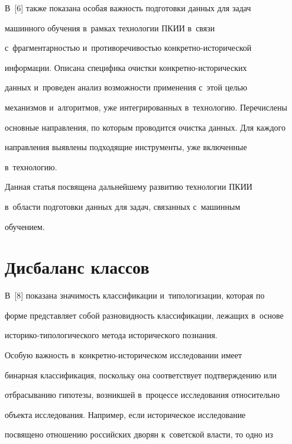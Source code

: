   


В~[6] также показана особая важность подготовки данных для задач 


машинного обучения в~рамках технологии ПКИИ в~связи 


с~фрагментарностью и~противоречивостью кон\-крет\-но-ис\-то\-ри\-че\-ской 


информации. Описана специфика очистки кон\-крет\-но-ис\-то\-ри\-че\-ских 


данных и~проведен анализ возможности применения с~этой \mbox{целью} 


механизмов и~алгоритмов, уже интегрированных в~технологию. Перечислены 


основные направления, по которым проводится очистка данных. Для каждого 


направления выявлены подходящие инструменты, уже включенные 


в~технологию.


  


  Данная статья посвящена дальнейшему развитию технологии ПКИИ 


в~об\-ласти подготовки данных для задач, связанных с~машинным  


обуче\-нием.





\section{Дисбаланс классов}





  В~[8] показана значимость классификации и~типологизации, которая по 


форме представляет собой разновидность классификации, лежащих в~основе  


ис\-то\-ри\-ко-ти\-по\-ло\-ги\-че\-ско\-го метода исторического познания. 


  


  Особую важность в~конкретно-историческом исследовании имеет 


бинарная классификация, поскольку она соответствует подтверждению или 


отбрасыванию гипотезы, возникшей в~процессе исследования относительно 


объекта исследования. Например, если историческое исследование 


посвящено отношению российских дворян к~советской власти, то одно из 


